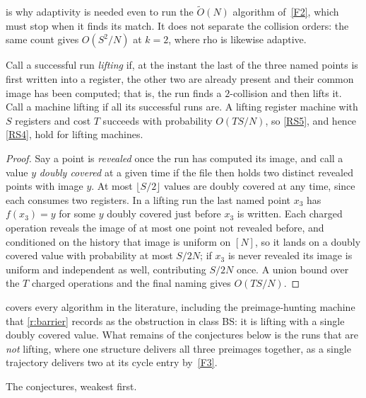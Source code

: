 \documentclass[11pt]{article}
\theoremstyle{plain}
\theoremstyle{definition}
\newenvironment{cthm}[1]%
  {\renewcommand{\theinnerthm}{#1}%
   \def\theHinnerthm{cthm.\arabic{innerthm}}\innerthm}{\endinnerthm}
\newcommand{\NN}{[N]}
\newcommand{\cls}[1]{\textsf{#1}}   %
\begin{document}
 is why adaptivity is needed even to run the $\tilde O(N)$
algorithm of~\ref{F2}, which must stop when it finds its match.  It does not
separate the collision orders: the same count gives $O(S^{2}/N)$ at $k=2$,
where rho is likewise adaptive.

\begin{cthm}{RS5'}[lifting machines]\label{RS5'}
Call a successful run \emph{lifting} if, at the instant the last of the
three named points is first written into a register, the other two are
already present and their common image has been computed; that is, the run
finds a $2$-collision and then lifts it.  Call a machine lifting if all its
successful runs are.  A lifting register machine with $S$ registers and
cost $T$ succeeds with probability $O(TS/N)$, so \cref{RS5}, and hence
\cref{RS4}, hold for lifting machines.
\end{cthm}

\begin{proof}
Say a point is \emph{revealed} once the run has computed its image, and call
a value $y$ \emph{doubly covered} at a given time if the file then holds two
distinct revealed points with image $y$.  At most $\lfloor S/2 \rfloor$
values are doubly covered at any time, since each consumes two registers.
In a lifting run the last named point $x_3$ has $f(x_3) = y$ for some $y$
doubly covered just before $x_3$ is written.  Each charged operation reveals
the image of at most one point not revealed before, and conditioned on the
history that image is uniform on $\NN$, so it lands on a doubly covered
value with probability at most $S/2N$; if $x_3$ is never revealed its image
is uniform and independent as well, contributing $S/2N$ once.  A union bound
over the $T$ charged operations and the final naming gives $O(TS/N)$.
\end{proof}

 covers every algorithm in the literature, including the
preimage-hunting machine that \cref{r:barrier} records as the obstruction in
class \cls{BS}: it is lifting with a single doubly covered value.  What
remains of the conjectures below is the runs that are \emph{not} lifting,
where one structure delivers all three preimages together, as a single
trajectory delivers two at its cycle entry by~\ref{F3}.

\medskip\noindent
The conjectures, weakest first.
\end{document}
